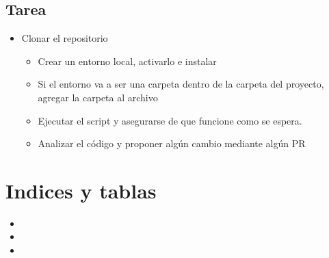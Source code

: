 \documentclass[a5paper,9pt,spanish]{sphinxmanual}
\begin{document}
\section{Tarea}
\label{\detokenize{requests:tarea}}\begin{itemize}
\item {} 
\sphinxAtStartPar
Clonar el repositorio %
\begin{footnote}[37]\sphinxAtStartFootnote
{}
%
\end{footnote}
\begin{itemize}
\item {} 
\sphinxAtStartPar
Crear un entorno local, activarlo e instalar 

\item {} 
\sphinxAtStartPar
Si el entorno va a ser una carpeta dentro de la carpeta del proyecto, agregar la
carpeta al archivo 

\item {} 
\sphinxAtStartPar
Ejecutar el script  y asegurarse de que funcione como se espera.

\item {} 
\sphinxAtStartPar
Analizar el código y proponer algún cambio mediante algún PR

\end{itemize}

\end{itemize}


\chapter{Indices y tablas}
\label{\detokenize{index:indices-y-tablas}}\begin{itemize}
\item {} 
\sphinxAtStartPar
{}

\item {} 
\sphinxAtStartPar
{}

\item {} 
\sphinxAtStartPar
{}

\end{itemize}



\renewcommand{\indexname}{Índice}
\printindex
\end{document}
